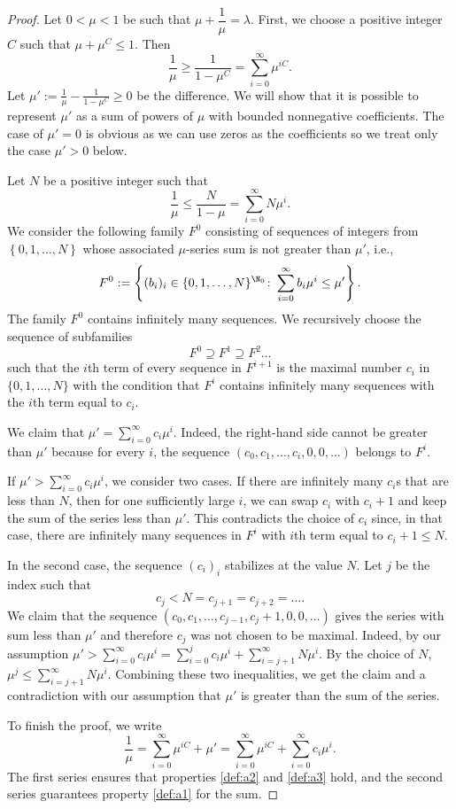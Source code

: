 \begin{proof}
Let $0< \mu < 1$ be such that $\mu+\dfrac{1}{\mu}=\lambda$. 
First, we choose a positive integer $C$ such that $\mu+\mu^C\leq 1$. Then
$$\frac{1}{\mu}\geq \frac{1}{1-\mu^C}=\sum_{i=0}^\infty\mu^{iC}.$$
Let $\mu':=\frac{1}{\mu}-\frac{1}{1-\mu^C}\geq 0$ be the difference. We will show that it is possible to represent $\mu'$ as a sum of powers of $\mu$ with bounded nonnegative coefficients. The case of $\mu'=0$ is obvious as we can use zeros as the coefficients so we treat only the case $\mu'>0$ below.

Let $N$ be a positive integer such that $$\frac{1}{\mu}\leq \dfrac{N}{1-\mu}=\sum_{i=0}^\infty N\mu^i.$$
We consider the following family $F^0$ consisting of sequences of integers from $\left\{0,1,\ldots,N\right\}$ whose associated $\mu$-series sum is not greater than $\mu'$, i.e.,
$$F^0:=\left\{(b_i)_i\in \{0,1,\ldots,N\}^{\N_0} \colon \sum_{i=0}^\infty b_i\mu^i\leq \mu' \right\}.$$
The family $F^0$ contains infinitely many sequences. We recursively choose the sequence of subfamilies
$$F^0 \supseteq F^1 \supseteq F^2 \ldots$$ such that the $i$th term of every sequence in $F^{i+1}$ is the maximal number $c_i$ in $\{0,1,\ldots,N\}$ with the condition that $F^i$ contains infinitely many sequences with the $i$th term equal to $c_i$. 

We claim that ${\displaystyle \mu'=\sum_{i=0}^{\infty}c_i\mu^i}$. Indeed, the right-hand side cannot be greater than $\mu'$ because for every $i$, the sequence $(c_0,c_1,\ldots,c_i,0,0,\ldots)$ belongs to $F^i$.  

If ${\displaystyle \mu'>\sum_{i=0}^{\infty}c_i\mu^i}$,  we consider two cases. If there are infinitely many $c_i$s that are less than $N$, then for one sufficiently large $i$, we can swap $c_i$ with $c_i+1$ and keep the sum of the series less than $\mu'$. This contradicts the choice of $c_i$ since, in that case, there are infinitely many sequences in $F^i$ with $i$th term equal to $c_i+1 \leq N$.

In the second case, the sequence $(c_i)_i$ stabilizes at the value $N$. Let $j$ be the index such that
$$c_j<N=c_{j+1}=c_{j+2}=\ldots.$$ We claim that the sequence $(c_0,c_1,\ldots,c_{j-1},c_j+1,0,0,\ldots)$ gives the series with sum less than $\mu'$ and therefore $c_j$ was not chosen to be maximal. Indeed, by our assumption ${\displaystyle \mu'>\sum_{i=0}^{\infty}c_i\mu^i=\sum_{i=0}^{j}c_i\mu^i+\sum_{i=j+1}^{\infty}N\mu^i}$. By the choice of $N$, ${\displaystyle \mu^j\leq \sum_{i=j+1}^{\infty}N\mu^i}$. Combining these two inequalities, we get the claim and a contradiction with our assumption that $\mu'$ is greater than the sum of the series.

To finish the proof, we write
$$\frac{1}{\mu}=\sum_{i=0}^\infty\mu^{iC}+\mu'=\sum_{i=0}^\infty\mu^{iC}+\sum_{i=0}^\infty c_i\mu^i.$$
The first series ensures that properties \ref{def:a2} and \ref{def:a3} hold, and the second series guarantees property \ref{def:a1} for the sum.
\end{proof}


